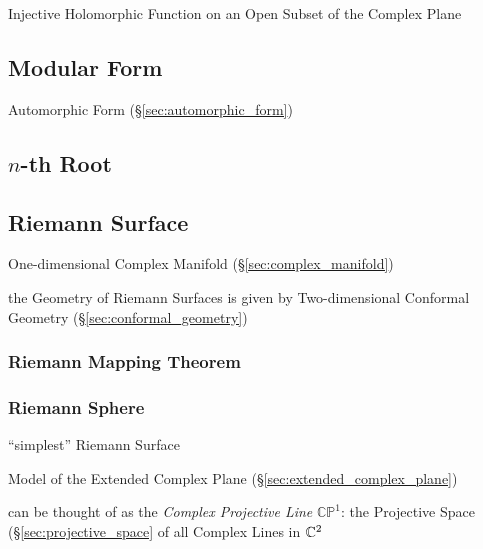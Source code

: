 Injective Holomorphic Function on an Open Subset of the Complex Plane



\subsection{Modular Form}\label{sec:modular_form}

Automorphic Form (\S\ref{sec:automorphic_form})



\subsection{$n$-th Root}\label{sec:nth_root}

\subsection{Riemann Surface}\label{sec:riemann_surface}

One-dimensional Complex Manifold (\S\ref{sec:complex_manifold})

the Geometry of Riemann Surfaces is given by Two-dimensional Conformal
Geometry (\S\ref{sec:conformal_geometry})



\subsubsection{Riemann Mapping Theorem}
\label{sec:riemann_mapping_theorem}

\subsubsection{Riemann Sphere}\label{sec:riemann_sphere}

``simplest'' Riemann Surface

Model of the Extended Complex Plane
(\S\ref{sec:extended_complex_plane})

can be thought of as the \emph{Complex Projective Line}
$\mathbb{CP}^1$: the Projective Space (\S\ref{sec:projective_space} of
all Complex Lines in $\mathbb{C}^2$



